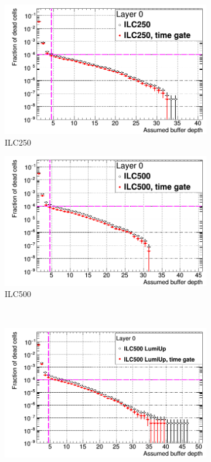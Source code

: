  \begin{figure}
 \centering
  \begin{subfigure}[t]{0.49\textwidth}
   \centering
    \includegraphics[width=\textwidth]{Figures/Pairs/Occupancy_Comparison_Layer_0_deadcells_ILC250_TimeGate.png}
   \caption{ILC250}
   \end{subfigure}
   \hfill
    \begin{subfigure}[t]{0.49\textwidth}
   \centering
    \includegraphics[width=\textwidth]{Figures/Pairs/Occupancy_Comparison_Layer_0_deadcells_ILC500_TimeGate.png}
   \caption{ILC500}
   \end{subfigure}\\
    \begin{subfigure}[t]{0.49\textwidth}
   \centering
    \includegraphics[width=\textwidth]{Figures/Pairs/Occupancy_Comparison_Layer_0_deadcells_ILC500LumiUp_TimeGate.png}

\end{subfigure}
\end{figure}
